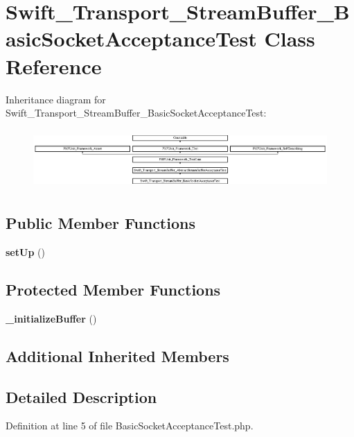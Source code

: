 \section{Swift\+\_\+\+Transport\+\_\+\+Stream\+Buffer\+\_\+\+Basic\+Socket\+Acceptance\+Test Class Reference}
\label{class_swift___transport___stream_buffer___basic_socket_acceptance_test}
Inheritance diagram for Swift\+\_\+\+Transport\+\_\+\+Stream\+Buffer\+\_\+\+Basic\+Socket\+Acceptance\+Test\+:\begin{figure}[H]
\begin{center}
\leavevmode
\includegraphics[height=2.287582cm]{class_swift___transport___stream_buffer___basic_socket_acceptance_test}
\end{center}
\end{figure}
\subsection*{Public Member Functions}
\begin{DoxyCompactItemize}
\item 
{\bf set\+Up} ()
\end{DoxyCompactItemize}
\subsection*{Protected Member Functions}
\begin{DoxyCompactItemize}
\item 
{\bf \+\_\+initialize\+Buffer} ()
\end{DoxyCompactItemize}
\subsection*{Additional Inherited Members}


\subsection{Detailed Description}


Definition at line 5 of file Basic\+Socket\+Acceptance\+Test.\+php.



